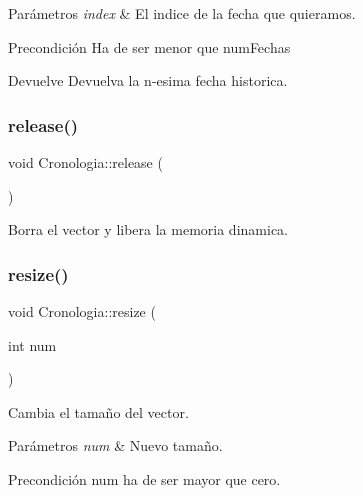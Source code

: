 \begin{DoxyParams}{Parámetros}
{\em index} & El indice de la fecha que quieramos. \\
\hline
\end{DoxyParams}
\begin{DoxyPrecond}{Precondición}
Ha de ser menor que num\+Fechas 
\end{DoxyPrecond}
\begin{DoxyReturn}{Devuelve}
Devuelva la n-\/esima fecha historica. 
\end{DoxyReturn}
\mbox{\label{classCronologia_a7e1e47606ad4c408238173a95f05a7e6}} 
\subsubsection{\texorpdfstring{release()}{release()}}
{\footnotesize\ttfamily void Cronologia\+::release (\begin{DoxyParamCaption}{ }\end{DoxyParamCaption})\hspace{0.3cm}{\ttfamily [private]}}



Borra el vector y libera la memoria dinamica. 

\mbox{\label{classCronologia_ae10371de1410f2431021cea67a006c8d}} 
\subsubsection{\texorpdfstring{resize()}{resize()}}
{\footnotesize\ttfamily void Cronologia\+::resize (\begin{DoxyParamCaption}\item[{int}]{num }\end{DoxyParamCaption})\hspace{0.3cm}{\ttfamily [private]}}



Cambia el tamaño del vector. 


\begin{DoxyParams}{Parámetros}
{\em num} & Nuevo tamaño. \\
\hline
\end{DoxyParams}
\begin{DoxyPrecond}{Precondición}
num ha de ser mayor que cero. 
\end{DoxyPrecond}


